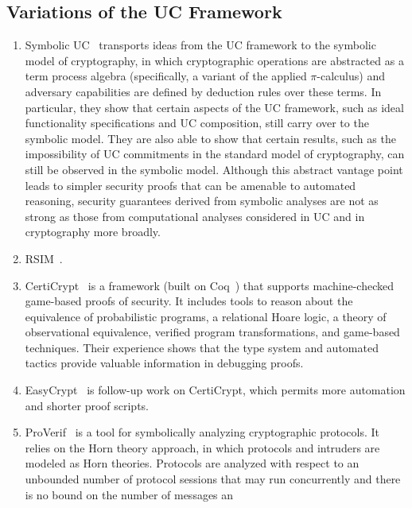 \subsection{Variations of the UC Framework}
\label{subsec:uc-variants}

\begin{enumerate}[leftmargin=*]
  \item Symbolic UC~\cite{bohl2016symbolic} transports ideas from the UC
    framework to the symbolic model of cryptography, in which cryptographic
    operations are abstracted as a term process algebra (specifically, a variant
    of the applied $\pi$-calculus) and adversary capabilities are defined by
    deduction rules over these terms. In particular, they show that certain
    aspects of the UC framework, such as ideal functionality specifications and
    UC composition, still carry over to the symbolic model. They are also able
    to show that certain results, such as the impossibility of UC commitments in
    the standard model of cryptography, can still be observed in the symbolic
    model. Although this abstract vantage point leads to simpler security proofs
    that can be amenable to automated reasoning, security guarantees derived
    from symbolic analyses are not as strong as those from computational
    analyses considered in UC and in cryptography more broadly.
  \item RSIM~\cite{backes2007reactive}.
  \item CertiCrypt~\cite{barthe2009formal} is a framework (built on
    Coq~\cite{barras1997coq}) that supports machine-checked game-based proofs of
    security. It includes tools to reason about the equivalence of probabilistic
    programs, a relational Hoare logic, a theory of observational equivalence,
    verified program transformations, and game-based techniques.  Their
    experience shows that the type system and automated tactics provide valuable
    information in debugging proofs.
  \item EasyCrypt~\cite{barthe2011computer} is follow-up work on CertiCrypt,
    which permits more automation and shorter proof scripts. 
  \item ProVerif~\cite{blanchet2010proverif} is a tool for symbolically
    analyzing cryptographic protocols. It relies on the Horn theory approach, in
    which protocols and intruders are modeled as Horn theories. Protocols are
    analyzed with respect to an unbounded number of protocol sessions that may
    run concurrently and there is no bound on the number of messages an

\end{enumerate}
